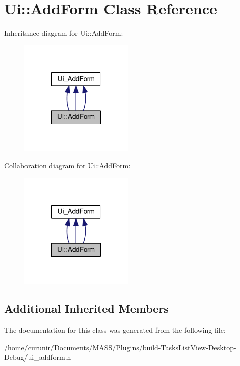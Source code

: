 \hypertarget{class_ui_1_1_add_form}{}\section{Ui\+:\+:Add\+Form Class Reference}
\label{class_ui_1_1_add_form}


Inheritance diagram for Ui\+:\+:Add\+Form\+:
\nopagebreak
\begin{figure}[H]
\begin{center}
\leavevmode
\includegraphics[width=152pt]{class_ui_1_1_add_form__inherit__graph}
\end{center}
\end{figure}


Collaboration diagram for Ui\+:\+:Add\+Form\+:
\nopagebreak
\begin{figure}[H]
\begin{center}
\leavevmode
\includegraphics[width=152pt]{class_ui_1_1_add_form__coll__graph}
\end{center}
\end{figure}
\subsection*{Additional Inherited Members}


The documentation for this class was generated from the following file\+:\begin{DoxyCompactItemize}
\item 
/home/curunir/\+Documents/\+M\+A\+S\+S/\+Plugins/build-\/\+Tasks\+List\+View-\/\+Desktop-\/\+Debug/ui\+\_\+addform.\+h\end{DoxyCompactItemize}
